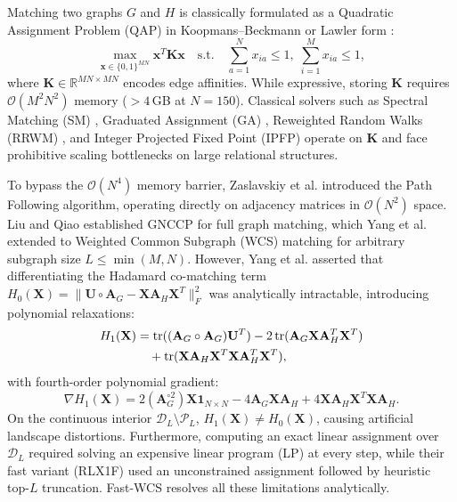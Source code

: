 \documentclass[conference]{IEEEtran}
\begin{document}
Matching two graphs $G$ and $H$ is classically formulated as a Quadratic Assignment Problem (QAP) in Koopmans--Beckmann \cite{koopmans1957} or Lawler form \cite{lawler1963}:
\begin{equation}
\max_{\mathbf{x} \in \{0, 1\}^{MN}} \mathbf{x}^T \mathbf{K} \mathbf{x} \quad \text{s.t.} \quad \sum_{a=1}^N x_{ia} \leq 1, \; \sum_{i=1}^M x_{ia} \leq 1,
\label{eq:lawler}
\end{equation}
where $\mathbf{K} \in \mathbb{R}^{MN \times MN}$ encodes edge affinities. While expressive, storing $\mathbf{K}$ requires $\mathcal{O}(M^2 N^2)$ memory ($>4$\,GB at $N=150$). Classical solvers such as Spectral Matching (SM) \cite{leordeanu2005}, Graduated Assignment (GA) \cite{gold1996}, Reweighted Random Walks (RRWM) \cite{cho2010rrwm}, and Integer Projected Fixed Point (IPFP) \cite{leordeanu2009ipfp} operate on $\mathbf{K}$ and face prohibitive scaling bottlenecks on large relational structures.

To bypass the $\mathcal{O}(N^4)$ memory barrier, Zaslavskiy et al. \cite{zaslavskiy2009} introduced the Path Following algorithm, operating directly on adjacency matrices in $\mathcal{O}(N^2)$ space. Liu and Qiao \cite{liu2015graduated} established GNCCP for full graph matching, which Yang et al. \cite{yang2018algorithm} extended to Weighted Common Subgraph (WCS) matching for arbitrary subgraph size $L \leq \min(M, N)$. However, Yang et al. asserted that differentiating the Hadamard co-matching term $H_0(\mathbf{X}) = \|\mathbf{U} \circ \mathbf{A}_G - \mathbf{X}\mathbf{A}_H\mathbf{X}^T\|_F^2$ was analytically intractable, introducing polynomial relaxations:
\begin{align}
H_1(\mathbf{X}) &= \operatorname{tr}((\mathbf{A}_G \circ \mathbf{A}_G)\mathbf{U}^T) - 2\operatorname{tr}(\mathbf{A}_G\mathbf{X}\mathbf{A}_H^T\mathbf{X}^T) \notag\\
&\quad + \operatorname{tr}(\mathbf{X}\mathbf{A}_H\mathbf{X}^T\mathbf{X}\mathbf{A}_H^T\mathbf{X}^T),
\label{eq:rlx1}
\end{align}
with fourth-order polynomial gradient:
\begin{equation}
\nabla H_1(\mathbf{X}) = 2(\mathbf{A}_G^{\circ 2})\mathbf{X}\mathbf{1}_{N\times N} - 4\mathbf{A}_G\mathbf{X}\mathbf{A}_H + 4\mathbf{X}\mathbf{A}_H\mathbf{X}^T\mathbf{X}\mathbf{A}_H.
\label{eq:rlx1_grad}
\end{equation}
On the continuous interior $\mathcal{D}_L \setminus \mathcal{P}_L$, $H_1(\mathbf{X}) \neq H_0(\mathbf{X})$, causing artificial landscape distortions. Furthermore, computing an exact linear assignment over $\mathcal{D}_L$ required solving an expensive linear program (LP) at every step, while their fast variant (RLX1F) used an unconstrained assignment followed by heuristic top-$L$ truncation. Fast-WCS resolves all these limitations analytically.
\end{document}
